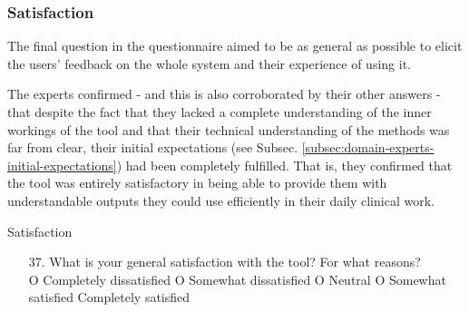 \subsubsection{Satisfaction}
The final question in the questionnaire aimed to be as general as possible to elicit the users' feedback on the whole system and their experience of using it.

The experts confirmed - and this is also corroborated by their other answers - that despite the fact that they lacked a complete understanding of the inner workings of the tool and that their technical understanding of the methods was far from clear, their initial expectations (see Subsec. \ref{subsec:domain-experts-initial-expectations}) had been completely fulfilled.
That is, they confirmed that the tool was entirely satisfactory in being able to provide them with understandable outputs they could use efficiently in their daily clinical work.

\begin{mdframed}
	{\Large Satisfaction}
	\begin{enumerate}[resume]
		\item[37.] What is your general satisfaction with the tool? For what reasons? \\
		O Completely dissatisfied O Somewhat dissatisfied O Neutral O Somewhat satisfied  Completely satisfied
	\end{enumerate}
	\label{app:questionnaire}
\end{mdframed}
